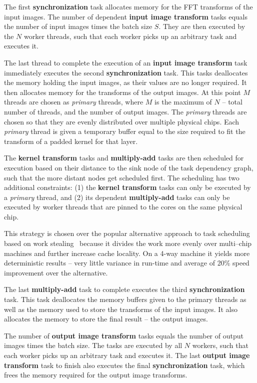 \documentclass[conference]{./IEEEtran/IEEEtran}
\begin{document}
  The first {\bf synchronization} task allocates memory for the FFT
  transforms of the input images.  The number of dependent {\bf input
    image transform} tasks equals the number of input images times the
  batch size $S$.  They are then executed by the $N$ worker threads,
  such that each worker picks up an arbitrary task and executes it.

  The last thread to complete the execution of an {\bf input image
    transform} task immediately executes the second {\bf
    synchronization} task.  This tasks deallocates the memory holding
  the input images, as their values are no longer required. It then
  allocates memory for the transforms of the output images.  At this
  point $M$ threads are chosen as \emph{primary} threads, where $M$ is
  the maximum of $N$ -- total number of threads, and the number of
  output images.  The \emph{primary} threads are chosen so that they
  are evenly distributed over multiple physical chips.  Each
  \emph{primary} thread is given a temporary buffer equal to the size
  required to fit the transform of a padded kernel for that layer.

  The {\bf kernel transform} tasks and {\bf multiply-add} tasks are
  then scheduled for execution based on their distance to the sink
  node of the task dependency graph, such that the more distant nodes
  get scheduled first.  The scheduling has two additional constraints:
  (1) the {\bf kernel transform} tasks can only be executed by a
  \emph{primary} thread, and (2) its dependent {\bf multiply-add}
  tasks can only be executed by worker threads that are pinned to the
  cores on the same physical chip.

  This strategy is chosen over the popular alternative approach to
  task scheduling based on work stealing~\cite{reinders2007intel,
    willhalm2008putting} because it divides the work more evenly over
  multi--chip machines and further increase cache locality.  On a
  4-way machine it yields more deterministic results -- very little
  variance in run-time and average of 20\% speed improvement over the
  alternative.

  The last {\bf multiply-add} task to complete executes the third {\bf
    synchronization} task.  This task deallocates the memory buffers
  given to the primary threads as well as the memory used to store the
  transforms of the input images.  It also allocates the memory to
  store the final result -- the output images.

  The number of {\bf output image transform} tasks equals the number
  of output images times the batch size.  The tasks are executed by
  all $N$ workers, such that each worker picks up an arbitrary task
  and executes it.  The last {\bf output image transform} task to
  finish also executes the final {\bf synchronization} task, which
  frees the memory required for the output image transforms.
\end{document}
